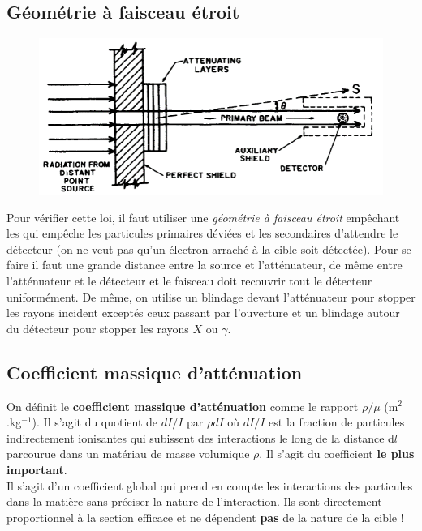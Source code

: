 \subsection{Géométrie à faisceau étroit}
	\begin{figure}
	\vspace{-5mm}
	\includegraphics[scale=0.4]{ch4/image16}
	\end{figure}
Pour vérifier cette loi, il faut utiliser une \textit{géométrie à faisceau étroit} empêchant les
qui empêche les particules primaires déviées et les secondaires d'attendre le détecteur (on 
ne veut pas qu'un électron arraché à la cible soit détectée). Pour se faire il faut une grande 
distance entre la source et l'atténuateur, de même entre l'atténuateur et le détecteur et le 
faisceau doit recouvrir tout le détecteur uniformément. De même, on utilise un blindage devant
l'atténuateur pour stopper les rayons incident exceptés ceux passant par l'ouverture et un 
blindage autour du détecteur pour stopper les rayons $X$ ou $\gamma$.

\subsection{Coefficient massique d'atténuation}%
On définit le \textbf{coefficient massique d'atténuation} comme le rapport $\rho/\mu$ 
(m$^2$.kg$^{-1}$). Il s'agit du quotient de $dI/I$ par $\rho dI$ où $dI/I$ est la fraction de
particules indirectement ionisantes qui subissent des interactions le long de la distance d$l$ 
parcourue dans un matériau de masse volumique $\rho$. Il s'agit du coefficient \textbf{le plus
important}.\\

Il s'agit d'un coefficient global qui prend en compte les interactions des particules dans la 
matière sans préciser la nature de l'interaction. Ils sont directement proportionnel à la 
section efficace et ne dépendent \textbf{pas} de la nature de la cible !


